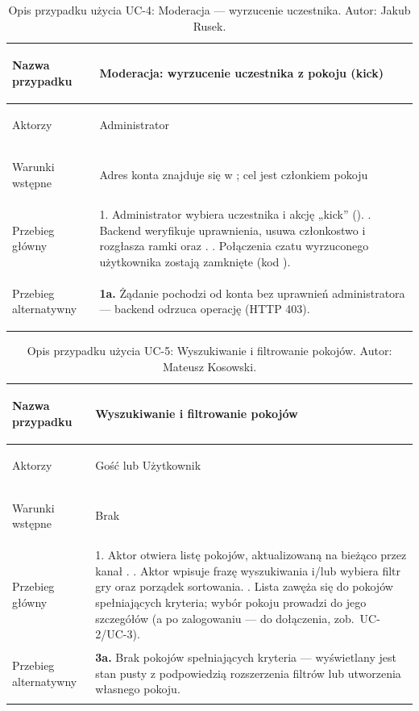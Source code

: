 \begin{table}[H]\footnotesize
\renewcommand{\arraystretch}{1.3}
\caption{Opis przypadku użycia UC-4: Moderacja — wyrzucenie uczestnika. Autor: Jakub Rusek.}
\label{tab:uc4}
\begin{tabularx}{\textwidth}{@{}>{\bfseries\raggedright\arraybackslash}p{}Y@{}}
\toprule
Nazwa przypadku & Moderacja: wyrzucenie uczestnika z pokoju (kick) \\
\midrule
Aktorzy & Administrator \\
Warunki wstępne & Adres konta znajduje się w ; cel jest członkiem pokoju \\
Przebieg główny &
  1. Administrator wybiera uczestnika i akcję „kick” (). . Backend weryfikuje uprawnienia, usuwa członkostwo i rozgłasza ramki  oraz . . Połączenia czatu wyrzuconego użytkownika zostają zamknięte (kod ). \\
Przebieg alternatywny &
  \textbf{1a.} Żądanie pochodzi od konta bez uprawnień administratora — backend odrzuca operację (HTTP 403). \\
\bottomrule
\end{tabularx}
\end{table}

\begin{table}[H]\footnotesize
\renewcommand{\arraystretch}{1.3}
\caption{Opis przypadku użycia UC-5: Wyszukiwanie i filtrowanie pokojów. Autor: Mateusz Kosowski.}
\label{tab:uc5}
\begin{tabularx}{\textwidth}{@{}>{\bfseries\raggedright\arraybackslash}p{}Y@{}}
\toprule
Nazwa przypadku & Wyszukiwanie i filtrowanie pokojów \\
\midrule
Aktorzy & Gość lub Użytkownik \\
Warunki wstępne & Brak \\
Przebieg główny &
  1. Aktor otwiera listę pokojów, aktualizowaną na bieżąco przez kanał . . Aktor wpisuje frazę wyszukiwania i/lub wybiera filtr gry oraz porządek sortowania. . Lista zawęża się do pokojów spełniających kryteria; wybór pokoju prowadzi do jego szczegółów (a po zalogowaniu — do dołączenia, zob.\ UC-2/UC-3). \\
Przebieg alternatywny &
  \textbf{3a.} Brak pokojów spełniających kryteria — wyświetlany jest stan pusty z podpowiedzią rozszerzenia filtrów lub utworzenia własnego pokoju. \\
\bottomrule
\end{tabularx}
\end{table}

